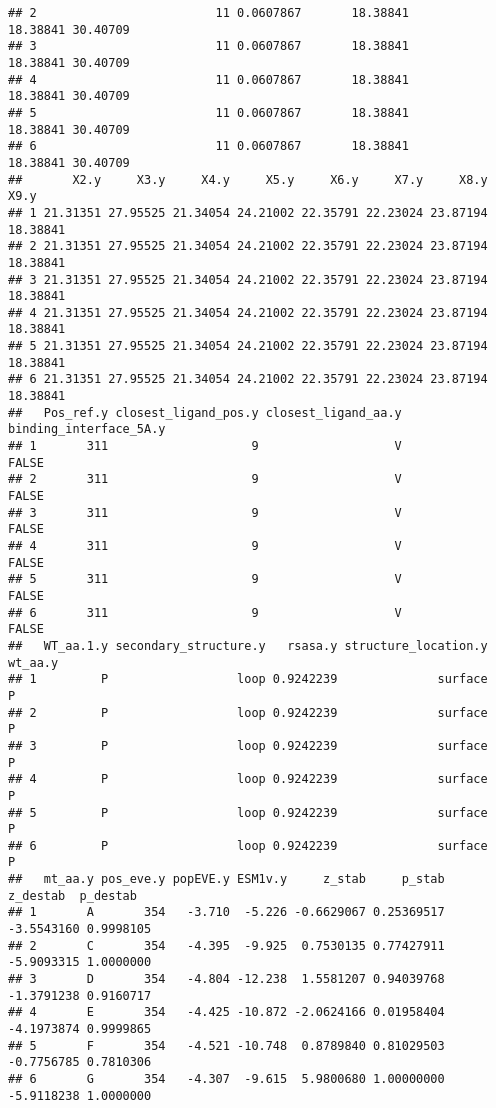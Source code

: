 \documentclass[
]{article}
\begin{document}
\begin{verbatim}
## 2                         11 0.0607867       18.38841         18.38841 30.40709
## 3                         11 0.0607867       18.38841         18.38841 30.40709
## 4                         11 0.0607867       18.38841         18.38841 30.40709
## 5                         11 0.0607867       18.38841         18.38841 30.40709
## 6                         11 0.0607867       18.38841         18.38841 30.40709
##       X2.y     X3.y     X4.y     X5.y     X6.y     X7.y     X8.y     X9.y
## 1 21.31351 27.95525 21.34054 24.21002 22.35791 22.23024 23.87194 18.38841
## 2 21.31351 27.95525 21.34054 24.21002 22.35791 22.23024 23.87194 18.38841
## 3 21.31351 27.95525 21.34054 24.21002 22.35791 22.23024 23.87194 18.38841
## 4 21.31351 27.95525 21.34054 24.21002 22.35791 22.23024 23.87194 18.38841
## 5 21.31351 27.95525 21.34054 24.21002 22.35791 22.23024 23.87194 18.38841
## 6 21.31351 27.95525 21.34054 24.21002 22.35791 22.23024 23.87194 18.38841
##   Pos_ref.y closest_ligand_pos.y closest_ligand_aa.y binding_interface_5A.y
## 1       311                    9                   V                  FALSE
## 2       311                    9                   V                  FALSE
## 3       311                    9                   V                  FALSE
## 4       311                    9                   V                  FALSE
## 5       311                    9                   V                  FALSE
## 6       311                    9                   V                  FALSE
##   WT_aa.1.y secondary_structure.y   rsasa.y structure_location.y wt_aa.y
## 1         P                  loop 0.9242239              surface       P
## 2         P                  loop 0.9242239              surface       P
## 3         P                  loop 0.9242239              surface       P
## 4         P                  loop 0.9242239              surface       P
## 5         P                  loop 0.9242239              surface       P
## 6         P                  loop 0.9242239              surface       P
##   mt_aa.y pos_eve.y popEVE.y ESM1v.y     z_stab     p_stab   z_destab  p_destab
## 1       A       354   -3.710  -5.226 -0.6629067 0.25369517 -3.5543160 0.9998105
## 2       C       354   -4.395  -9.925  0.7530135 0.77427911 -5.9093315 1.0000000
## 3       D       354   -4.804 -12.238  1.5581207 0.94039768 -1.3791238 0.9160717
## 4       E       354   -4.425 -10.872 -2.0624166 0.01958404 -4.1973874 0.9999865
## 5       F       354   -4.521 -10.748  0.8789840 0.81029503 -0.7756785 0.7810306
## 6       G       354   -4.307  -9.615  5.9800680 1.00000000 -5.9118238 1.0000000

\end{verbatim}
\end{document}
